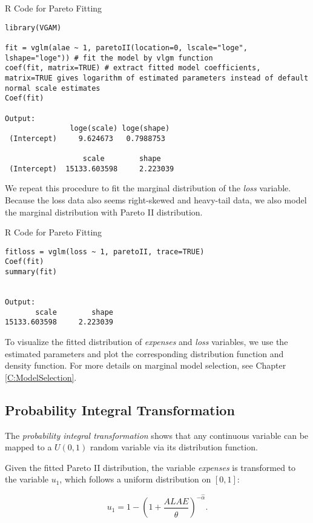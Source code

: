\documentclass[]{book}
\theoremstyle{definition}
\theoremstyle{definition}
\theoremstyle{definition}
\theoremstyle{remark}
\begin{document}
R Code for Pareto Fitting

\hypertarget{display.Reg.2}{}
\begin{verbatim}
library(VGAM)

fit = vglm(alae ~ 1, paretoII(location=0, lscale="loge", lshape="loge")) # fit the model by vlgm function
coef(fit, matrix=TRUE) # extract fitted model coefficients, matrix=TRUE gives logarithm of estimated parameters instead of default normal scale estimates
Coef(fit)

Output: 
               loge(scale) loge(shape)
 (Intercept)     9.624673   0.7988753
 
                  scale        shape 
 (Intercept)  15133.603598     2.223039 
\end{verbatim}

We repeat this procedure to fit the marginal distribution of the
\emph{loss} variable. Because the loss data also seems right-skewed and
heavy-tail data, we also model the marginal distribution with Pareto II
distribution.

R Code for Pareto Fitting

\hypertarget{display.ParFit.2}{}
\begin{verbatim}
fitloss = vglm(loss ~ 1, paretoII, trace=TRUE)
Coef(fit)
summary(fit)


Output: 
       scale        shape 
15133.603598     2.223039 
\end{verbatim}

To visualize the fitted distribution of \emph{expenses } and \emph{loss}
variables, we use the estimated parameters and plot the corresponding
distribution function and density function. For more details on marginal
model selection, see Chapter \ref{C:ModelSelection}.

\subsection{Probability Integral
Transformation}\label{probability-integral-transformation}

The \emph{probability integral transformation } shows that any
continuous variable can be mapped to a \(U(0,1)\) random variable via
its distribution function.

Given the fitted Pareto II distribution, the variable \emph{expenses} is
transformed to the variable \(u_1\), which follows a uniform
distribution on \([0,1]\):

\[u_1 = 1 - \left( 1 + \frac{ALAE}{\hat{\theta}} \right)^{-\hat{\alpha}}.\]
\end{document}
